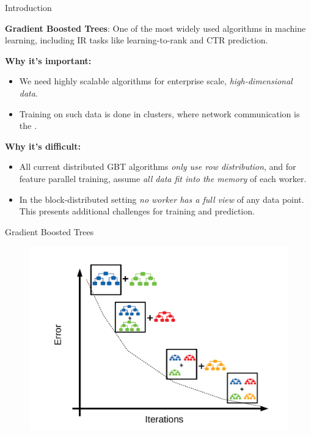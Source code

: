 \documentclass[final]{beamer}
\newlength{\onecolwid}
\begin{document}
\begin{frame}[t]
\begin{columns}[t]
\begin{column}{\onecolwid}
	\begin{block}{Introduction}
	
		\textbf{Gradient Boosted Trees}: One of the most widely used algorithms
		in machine learning, including IR tasks like learning-to-rank
		and CTR prediction.
	
		\vspace{15pt}
		\textbf{Why it's important:}
	
		\begin{itemize}
			\item We need highly scalable algorithms for enterprise scale, \emph{high-dimensional
			data}.
			\item Training on such data is done in clusters, where network communication
			is the \emph. %
		\end{itemize}
	
		\textbf{Why it's difficult:}
	
		\begin{itemize}
	
		\item All current distributed GBT algorithms \emph{only use row distribution},
			and for feature parallel training, assume \emph{all data fit into the memory} of each worker.
		\item In the block-distributed setting \emph{no worker has a full view} of any data point.
			This presents additional challenges for training and prediction.
		\end{itemize}
	
	\end{block}


	\begin{block}{Gradient Boosted Trees}
	
		\begin{figure}
		\includegraphics[width=\onecolwid]{gbt-illustration}
			\label{fig:gbt-training}
		\end{figure}
	

\end{block}
\end{column}
\end{columns}
\end{frame}
\end{document}
